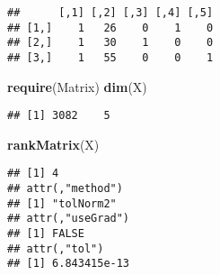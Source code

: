 \documentclass[ignorenonframetext,]{beamer}
\newenvironment{Shaded}{\begin{snugshade}}{\end{snugshade}}
\newcommand{\KeywordTok}[1]{\textcolor[rgb]{0.13,0.29,0.53}{\textbf{#1}}}
\newcommand{\DecValTok}[1]{\textcolor[rgb]{0.00,0.00,0.81}{#1}}
\newcommand{\StringTok}[1]{\textcolor[rgb]{0.31,0.60,0.02}{#1}}
\newcommand{\CommentTok}[1]{\textcolor[rgb]{0.56,0.35,0.01}{\textit{#1}}}
\newcommand{\OperatorTok}[1]{\textcolor[rgb]{0.81,0.36,0.00}{\textbf{#1}}}
\newcommand{\NormalTok}[1]{#1}
\begin{document}
\begin{frame}[fragile]

\footnotesize

\begin{Shaded}
\end{Shaded}

\begin{verbatim}
##      [,1] [,2] [,3] [,4] [,5]
## [1,]    1   26    0    1    0
## [2,]    1   30    1    0    0
## [3,]    1   55    0    0    1
\end{verbatim}

\begin{Shaded}
\begin{Highlighting}[]
\KeywordTok{require}\NormalTok{(Matrix)}
\KeywordTok{dim}\NormalTok{(X)}
\end{Highlighting}
\end{Shaded}

\begin{verbatim}
## [1] 3082    5
\end{verbatim}

\begin{Shaded}
\begin{Highlighting}[]
\KeywordTok{rankMatrix}\NormalTok{(X)}
\end{Highlighting}
\end{Shaded}

\begin{verbatim}
## [1] 4
## attr(,"method")
## [1] "tolNorm2"
## attr(,"useGrad")
## [1] FALSE
## attr(,"tol")
## [1] 6.843415e-13
\end{verbatim}

\normalsize

\end{frame}
\end{document}
